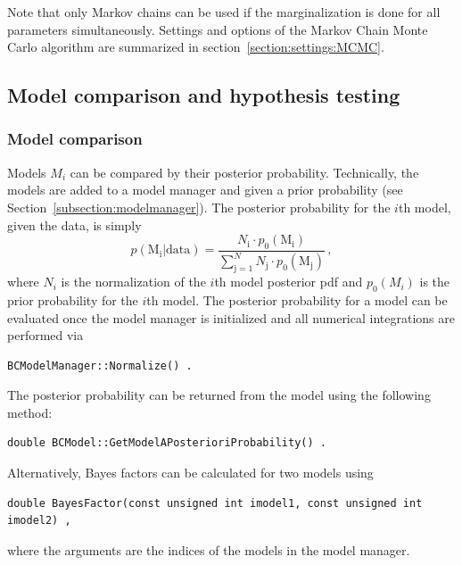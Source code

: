 \documentclass[11pt, a4paper]{article}
\begin{document}
\noindent
Note that only Markov chains can be used if the marginalization is
done for all parameters simultaneously. Settings and options of the
Markov Chain Monte Carlo algorithm are summarized in
section~\ref{section:settings:MCMC}. \\


\subsection{Model comparison and hypothesis testing}


\subsubsection{Model comparison}

Models $M_{i}$ can be compared by their posterior
probability. Technically, the models are added to a model manager and
given a prior probability (see
Section~\ref{subsection:modelmanager}). The posterior probability for
the $i$th model, given the data, is simply
%
\begin{equation}
p(\mathrm{M_{i}}|\mathrm{data}) = \frac{N_{\mathrm{i}} \cdot p_{0}(\mathrm{M_{i}})}{\sum_{\mathrm{j} = 1}^{N} N_{\mathrm{j}} \cdot p_{0}(\mathrm{M_{j}})} \, ,
\end{equation}
%
where $N_{i}$ is the normalization of the $i$th model posterior pdf
and $p_{0}(M_{i})$ is the prior probability for the $i$th model. The
posterior probability for a model can be evaluated once the model
manager is initialized and all numerical integrations are performed
via
%
\begin{verbatim}
BCModelManager::Normalize() .
\end{verbatim}
%
The posterior probability can be returned from the model using the
following method:
%
\begin{verbatim}
double BCModel::GetModelAPosterioriProbability() .
\end{verbatim}

\noindent 
Alternatively, Bayes factors can be calculated for two models using
%
\begin{verbatim}
double BayesFactor(const unsigned int imodel1, const unsigned int imodel2) ,
\end{verbatim}
%
\noindent
where the arguments are the indices of the models in the model
manager.
\end{document}
